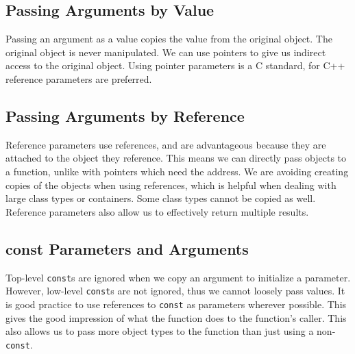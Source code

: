 \documentclass[12pt, a4paper]{report}
\begin{document}
\subsection{Passing Arguments by Value}
Passing an argument as a value copies the value from the original object.
The original object is never manipulated.
We can use pointers to give us indirect access to the original object.
Using pointer parameters is a C standard, for C++ reference parameters are preferred.
\subsection{Passing Arguments by Reference}
Reference parameters use references, and are advantageous because they are attached to the object they reference.
This means we can directly pass objects to a function, unlike with pointers which need the address.
We are avoiding creating copies of the objects when using references, which is helpful when dealing with large class types or containers.
Some class types cannot be copied as well.
Reference parameters also allow us to effectively return multiple results.
\subsection{const Parameters and Arguments}
Top-level \verb|const|s are ignored when we copy an argument to initialize a parameter.
However, low-level \verb|const|s are not ignored, thus we cannot loosely pass values.
It is good practice to use references to \verb|const| as parameters wherever possible.
This gives the good impression of what the function does to the function's caller.
This also allows us to pass more object types to the function than just using a non-\verb|const|.
\end{document}
